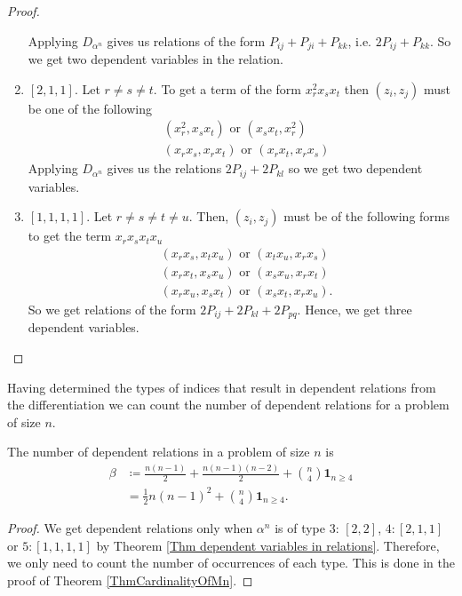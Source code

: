 \documentclass[a4paper,12pt,twoside,BCOR=10mm]{scrbook}
\begin{document}
\begin{theorem}
\begin{proof}
\begin{enumerate}[1:]
    Applying $D_{\alpha^n}$ gives us relations of the form $P_{ij} + P_{ji} + P_{kk}$, i.e. $2P_{ij} + P_{kk}$. So we get two dependent variables in the relation.
    \item $[2, 1, 1]$. Let $r \neq s \neq t$. To get a term of the form $x_r^2 x_s x_t$ then $(z_i, z_j)$ must be one of the following
    \begin{align*}
        &(x_r^2, x_sx_t) \text{ or } (x_sx_t, x_r^2)\\
        &(x_rx_s, x_rx_t) \text{ or } (x_rx_t, x_rx_s)
    \end{align*}
    Applying $D_{\alpha^n}$ gives us the relations $2P_{ij} + 2P_{kl}$ so we get two dependent variables.
    \item $[1,1,1,1]$. Let $r \neq s \neq t \neq u$. Then, $(z_i, z_j)$ must be of the following forms to get the term $x_r x_s x_t x_u$
    \begin{align*}
        &(x_rx_s, x_tx_u) \text{ or } (x_tx_u, x_rx_s)\\
        &(x_rx_t, x_sx_u) \text{ or } (x_sx_u, x_rx_t)\\
        &(x_rx_u, x_sx_t) \text{ or } (x_sx_t, x_rx_u).
    \end{align*}
    So we get relations of the form $2P_{ij} + 2P_{kl} + 2P_{pq}$. Hence, we get three dependent variables.
\end{enumerate}
\end{proof}
\end{theorem}

Having determined the types of indices that result in dependent relations from the differentiation we can count the number of dependent relations for a problem of size $n$.

\begin{corollary}\label{CorNumberOfDependentRelations}
The number of dependent relations in a problem of size $n$ is
\begin{align*}
    \beta &\coloneqq \frac{n(n-1)}{2} + \frac{n(n-1)(n-2)}{2} + \binom{n}{4}\mathbf{1}_{n\geq 4}\\
    &= \frac{1}{2}n(n - 1)^2 + \binom{n}{4}\mathbf{1}_{n\geq 4}.
\end{align*}
\end{corollary}
\begin{proof}
We get dependent relations only when $\alpha^n$ is of type $3:\, [2,2]$, $4: [2,1,1]$ or $5: [1,1,1,1]$ by Theorem \ref{Thm dependent variables in relations}. Therefore, we only need to count the number of occurrences of each type. This is done in the proof of Theorem \ref{ThmCardinalityOfMn}.\fi
\end{proof}
\end{document}
